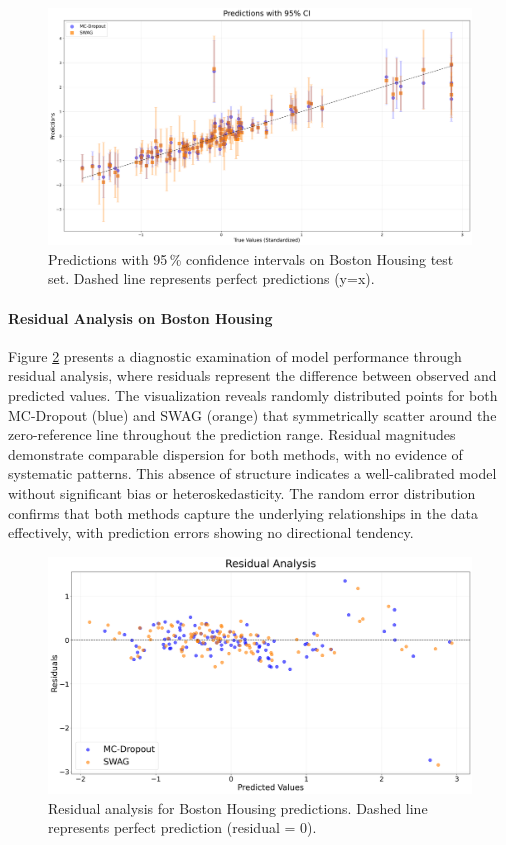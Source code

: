 \FloatBarrier

\begin{figure}[ht]
    \centering
    \includegraphics[width=0.9\linewidth]{plots/bh_uncertainty_intervals.png}
    \caption{Predictions with 95\,\% confidence intervals on Boston Housing test set. Dashed line represents perfect predictions (y=x).}
    \label{fig:bh_uncertainty_intervals}
\end{figure}

\FloatBarrier

\paragraph{Residual Analysis on Boston Housing}
Figure \ref{fig:bh_residuals} presents a diagnostic examination of model performance through residual analysis, where residuals represent the difference between observed and predicted values. The visualization reveals randomly distributed points for both MC-Dropout (blue) and SWAG (orange) that symmetrically scatter around the zero-reference line throughout the prediction range. Residual magnitudes demonstrate comparable dispersion for both methods, with no evidence of systematic patterns. This absence of structure indicates a well-calibrated model without significant bias or heteroskedasticity. The random error distribution confirms that both methods capture the underlying relationships in the data effectively, with prediction errors showing no directional tendency.

\FloatBarrier

\begin{figure}[htbp]
    \centering
    \includegraphics[width=0.9\linewidth]{plots/bh_residuals.png}
    \caption{Residual analysis for Boston Housing predictions. Dashed line represents perfect prediction (residual = 0).}
    \label{fig:bh_residuals}
\end{figure}

\FloatBarrier
